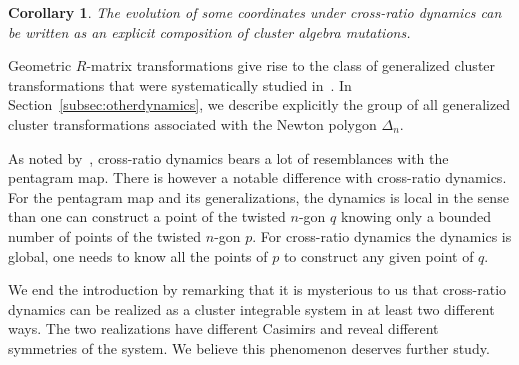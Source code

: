 \documentclass[pdftex]{sigma}
\numberwithin{equation}{section}
\newtheorem{Corollary}[Theorem]{Corollary}
\begin{document}
	\begin{Corollary}
		The evolution of some coordinates under cross-ratio dynamics can be written as an explicit composition of cluster algebra mutations.
	\end{Corollary}
	
	Geometric $R$-matrix transformations give rise to the class of generalized cluster transformations that were systematically studied in~\cite{GeRa}. In Section~\ref{subsec:otherdynamics}, we describe explicitly the group of all generalized cluster transformations associated with the Newton polygon $\Delta_n$.
	
	As noted by~\cite{AFIT}, cross-ratio dynamics bears a lot of resemblances with the pentagram map. There is however a notable difference with cross-ratio dynamics. For the pentagram map and its generalizations, the dynamics is local in the sense than one can construct a point of the twisted $n$-gon $q$ knowing only a bounded number of points of the twisted $n$-gon $p$. For cross-ratio dynamics the dynamics is global, one needs to know all the points of $p$ to construct any given point of $q$.
	
	We end the introduction by remarking that it is mysterious to us that cross-ratio dynamics can be realized as a cluster integrable system in at least two different ways. The two realizations have different Casimirs and reveal different symmetries of the system. We believe this phenomenon deserves further study.
	
	
\end{document}
